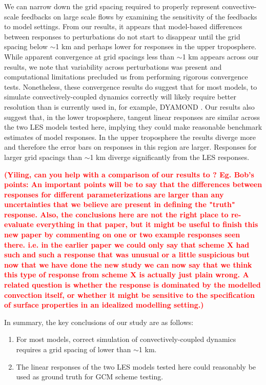 \documentclass[draft]{agujournal2019}
\newcommand{\todo}[1]{\textcolor{red}{\textbf{(#1)}}}
\begin{document}
We can narrow down the grid spacing required to properly represent
convective-scale feedbacks on large scale flows by examining the sensitivity of
the feedbacks to model settings. From our results, it appears that model-based
differences between responses to perturbations do not start to disappear until
the grid spacing below $\sim$1 km and perhaps lower for responses in the upper
troposphere. While apparent convergence at grid spacings less than $\sim$1
km appears across our results, we note that variability across perturbations was
present and computational limitations precluded us from performing rigorous
convergence tests. Nonetheless, these convergence results do suggest that for most models, to
simulate convectively-coupled dynamics correctly will likely require better
resolution than is currently used in, for example, DYAMOND
\cite{Stevens_PEPS_2019}. Our results also suggest that, in the lower troposphere,
tangent linear responses are similar across the two LES models tested here,
implying they could make reasonable benchmark estimates of model responses. In
the upper troposphere the results diverge more and therefore the error bars on
responses in this region are larger. Responses for larger grid spacings than
$\sim$1 km diverge significantly from the LES responses.

\todo{Yiling, can you help with a comparison of our results to
\citeA{Hwong_JAMES_2021}? Eg. Bob's points: An important points will be to say
that the differences between responses for different parameterizations are
larger than any uncertainties that we believe are present in defining the
"truth" response. Also, the conclusions here are not the right place to
re-evaluate everything in that paper, but it might be useful to finish this new
paper by commenting on one or two example responses seen there. i.e. in the
earlier paper we could only say that scheme X had such and such a response that
was unusual or a little suspicious but now that we have done the new study we
can now say that we think this type of response from scheme X is actually just
plain wrong. A related question is whether the response is dominated by the
modelled convection itself, or whether it might be sensitive to the
specification of surface properties in an idealized modelling setting.}

In summary, the key conclusions of our study are as follows:

\begin{enumerate}
    \item For most models, correct simulation of convectively-coupled dynamics requires a grid spacing of lower than $\sim$1 km.
    \item The linear responses of the two LES models tested here could reasonably be used as ground truth for GCM scheme testing.
\end{enumerate}
\end{document}
